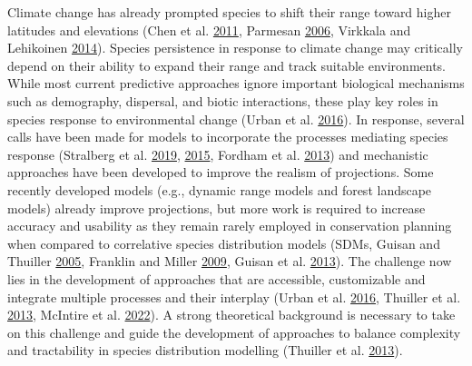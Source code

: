 \documentclass[12pt]{article}
\begin{document}
Climate change has already prompted species to shift their range toward
higher latitudes and elevations (Chen et al.
\protect\hyperlink{ref-chen_rapid_2011}{2011}, Parmesan
\protect\hyperlink{ref-parmesan_ecological_2006}{2006}, Virkkala and
Lehikoinen \protect\hyperlink{ref-virkkala_patterns_2014}{2014}).
Species persistence in response to climate change may critically depend
on their ability to expand their range and track suitable environments.
While most current predictive approaches ignore important biological
mechanisms such as demography, dispersal, and biotic interactions, these
play key roles in species response to environmental change (Urban et al.
\protect\hyperlink{ref-urban_improving_2016}{2016}). In response,
several calls have been made for models to incorporate the processes
mediating species response (Stralberg et al.
\protect\hyperlink{ref-stralberg_conservation_2019}{2019},
\protect\hyperlink{ref-stralberg_conservation_2015}{2015}, Fordham et
al. \protect\hyperlink{ref-fordham_adapted_2013}{2013}) and mechanistic
approaches have been developed to improve the realism of projections.
Some recently developed models (e.g., dynamic range models and forest
landscape models) already improve projections, but more work is required
to increase accuracy and usability as they remain rarely employed in
conservation planning when compared to correlative species distribution
models (SDMs, Guisan and Thuiller
\protect\hyperlink{ref-guisan_predicting_2005}{2005}, Franklin and
Miller \protect\hyperlink{ref-franklin_mapping_2009}{2009}, Guisan et
al. \protect\hyperlink{ref-guisan_predicting_2013}{2013}). The challenge
now lies in the development of approaches that are accessible,
customizable and integrate multiple processes and their interplay (Urban
et al. \protect\hyperlink{ref-urban_improving_2016}{2016}, Thuiller et
al. \protect\hyperlink{ref-thuiller_road_2013}{2013}, McIntire et al.
\protect\hyperlink{ref-mcintire_perfict_2022}{2022}). A strong
theoretical background is necessary to take on this challenge and guide
the development of approaches to balance complexity and tractability in
species distribution modelling (Thuiller et al.
\protect\hyperlink{ref-thuiller_road_2013}{2013}).
\end{document}
